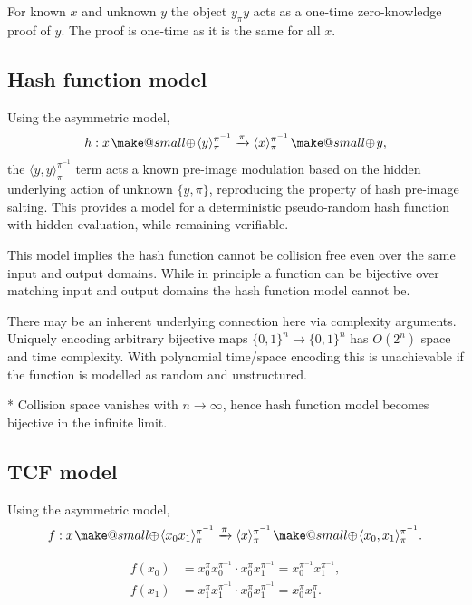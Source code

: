 \documentclass[twocolumn, aps, amsmath, amssymb, nofootinbib, superscriptaddress, longbibliography, doublefloatfix, table-of-contents, eqsecnum, rmp]{revtex4-2}
\makeatletter
\def\braid#1#2#3#4{\langle#1,#2\rangle_{#3}^{#4}}
\def\selfbraid#1#2#3{\langle#1\rangle_{#2}^{#3}}
\newcommand{\soplus}{{{\hspace{1pt}}{\mathbin{\mathpalette\make@small{\mathbin\oplus}}}}{\hspace{1pt}}}
\newcommand{\make@small}[2]{%
  \vcenter{\hbox{%
    \scalebox{0.6}{$\m@th#1#2$}%
  }}%
}
\makeatother
\begin{document}
For known $x$ and unknown $y$ the object $y_\pi y$ acts as a one-time zero-knowledge proof of $y$. The proof is one-time as it is the same for all $x$.

\subsection{Hash function model}

Using the asymmetric model,
\begin{align}
	h: x\soplus \selfbraid{y}{\pi}{\pi^{-1}} \xrightarrow{\pi} \selfbraid{x}{\pi}{\pi^{-1}} \soplus y,
\end{align}
the $\braid{y}{y}{\pi}{\pi^{-1}}$ term acts a known pre-image modulation based on the hidden underlying action of unknown $\{y,\pi\}$, reproducing the property of hash pre-image salting. This provides a model for a deterministic pseudo-random hash function with hidden evaluation, while remaining verifiable.

This model implies the hash function cannot be collision free even over the same input and output domains. While in principle a function can be bijective over matching input and output domains the hash function model cannot be.

There may be an inherent underlying connection here via complexity arguments. Uniquely encoding arbitrary bijective maps \mbox{$\{0,1\}^n\to \{0,1\}^n$} has $O(2^n)$ space and time complexity. With polynomial time/space encoding this is unachievable if the function is modelled as random and unstructured.

* Collision space vanishes with $n\to\infty$, hence hash function model becomes bijective in the infinite limit. 

\subsection{TCF model}

Using the asymmetric model,
\begin{align}
	f: x\soplus \selfbraid{x_0 x_1}{\pi}{\pi^{-1}} \xrightarrow{\pi} \selfbraid{x}{\pi}{\pi^{-1}} \soplus \braid{x_0}{x_1}{\pi}{\pi^{-1}}.
\end{align}

\begin{align}
	f(x_0) &= x_0^\pi x_0^{\pi^{-1}} \cdot x_0^\pi x_1^{\pi^{-1}} = x_0^{\pi^{-1}} x_1^{\pi^{-1}},\nonumber\\
	f(x_1) &= x_1^\pi x_1^{\pi^{-1}} \cdot x_0^\pi x_1^{\pi^{-1}} = x_0^{\pi} x_1^{\pi}.
\end{align}
\end{document}
